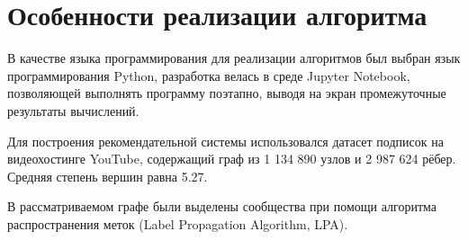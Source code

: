 \chapter{Особенности реализации алгоритма}

В качестве языка программирования для реализации алгоритмов был выбран язык программирования Python, разработка велась в среде Jupyter Notebook, позволяющей выполнять программу поэтапно, выводя на экран промежуточные результаты вычислений.

Для построения рекомендательной системы использовался датасет подписок на видеохостинге YouTube, содержащий граф из 1 134 890 узлов и 2 987 624 рёбер. Средняя степень вершин равна 5.27.

В рассматриваемом графе были выделены сообщества при помощи алгоритма распространения меток (Label Propagation Algorithm, LPA).

\clearpage
